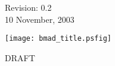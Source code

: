 \thispagestyle{empty}

\begin{flushright}
\large
  Revision: 0.2 \\
  10 November, 2003 \\
\end{flushright}

\vfill

{
\begin{center}
\texttt{[image: bmad\_title.psfig]} \\
\end{center}
}

\vskip 1in
\begin{center}
\Huge DRAFT
\end{center}
\vfill
\break